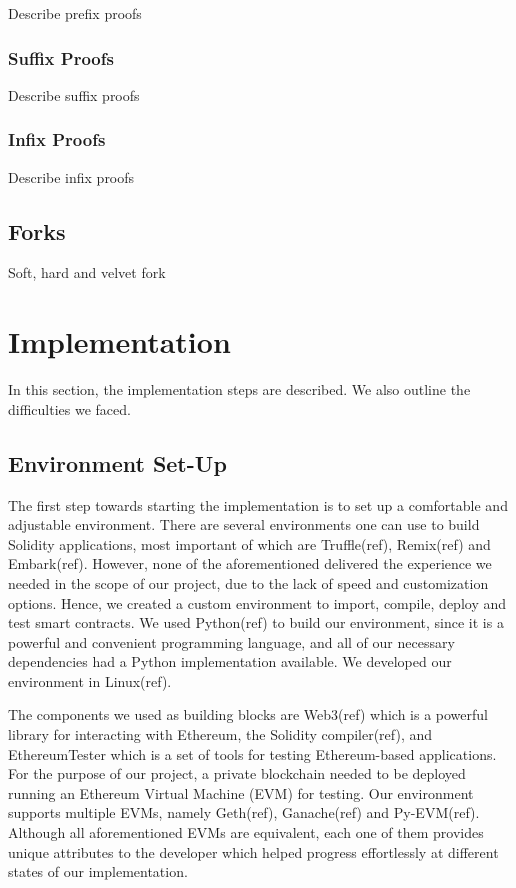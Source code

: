 \documentclass{article}
\begin{document}
  Describe prefix proofs

  \subsubsection{Suffix Proofs}

  Describe suffix proofs

  \subsubsection{Infix Proofs}

  Describe infix proofs

  \subsection{Forks}

  Soft, hard and velvet fork

  \section{Implementation}

  In this section, the implementation steps are described. We also
  outline the difficulties we faced.

  \subsection{Environment Set-Up}
  The first step towards starting the
  implementation is to set up a comfortable and adjustable environment.
  There are several environments one can use to build Solidity
  applications, most important of which are Truffle(ref), Remix(ref) and
  Embark(ref). However, none of the aforementioned delivered the
  experience we needed in the scope of our project, due to the lack of
  speed and customization options. Hence, we created a custom
  environment to import, compile, deploy and test smart contracts. We
  used Python(ref) to build our environment, since it is a powerful and
  convenient programming language, and all of our necessary dependencies
  had a Python implementation available. We developed our environment in
  Linux(ref).

  The components we used as building blocks are Web3(ref) which is a
  powerful library for interacting with Ethereum, the Solidity
  compiler(ref), and EthereumTester which is a set of tools for testing
  Ethereum-based applications. For the purpose of our project, a private
  blockchain needed to be deployed running an Ethereum Virtual Machine
  (EVM) for testing. Our environment supports multiple EVMs, namely
  Geth(ref), Ganache(ref) and Py-EVM(ref). Although all aforementioned
  EVMs are equivalent, each one of them provides unique attributes to
  the developer which helped progress effortlessly at different states
  of our implementation.
\end{document}
